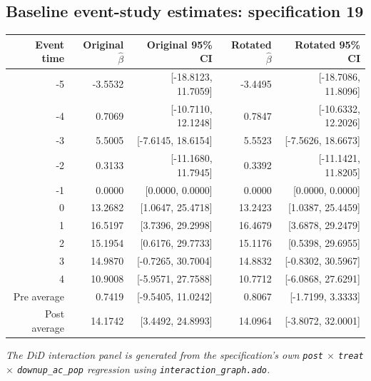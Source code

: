 \documentclass[10pt]{article}
\begin{document}
\subsection*{Baseline event-study estimates: specification 19}
\begin{center}
\scriptsize
\begin{tabular}{r rr rr}
\toprule
Event time & Original $\hat\beta$ & Original 95\% CI & Rotated $\hat\beta$ & Rotated 95\% CI \\
\midrule
-5 & -3.5532 & [-18.8123, 11.7059] & -3.4495 & [-18.7086, 11.8096] \\
-4 & 0.7069 & [-10.7110, 12.1248] & 0.7847 & [-10.6332, 12.2026] \\
-3 & 5.5005 & [-7.6145, 18.6154] & 5.5523 & [-7.5626, 18.6673] \\
-2 & 0.3133 & [-11.1680, 11.7945] & 0.3392 & [-11.1421, 11.8205] \\
-1 & 0.0000 & [0.0000, 0.0000] & 0.0000 & [0.0000, 0.0000] \\
0 & 13.2682 & [1.0647, 25.4718] & 13.2423 & [1.0387, 25.4459] \\
1 & 16.5197 & [3.7396, 29.2998] & 16.4679 & [3.6878, 29.2479] \\
2 & 15.1954 & [0.6176, 29.7733] & 15.1176 & [0.5398, 29.6955] \\
3 & 14.9870 & [-0.7265, 30.7004] & 14.8832 & [-0.8302, 30.5967] \\
4 & 10.9008 & [-5.9571, 27.7588] & 10.7712 & [-6.0868, 27.6291] \\
\midrule
Pre average & 0.7419 & [-9.5405, 11.0242] & 0.8067 & [-1.7199, 3.3333] \\
Post average & 14.1742 & [3.4492, 24.8993] & 14.0964 & [-3.8072, 32.0001] \\
\bottomrule
\end{tabular}
\end{center}
\medskip
\textit{The DiD interaction panel is generated from the specification's own \texttt{post} $\times$ \texttt{treat} $\times$ \texttt{downup\_ac\_pop} regression using \texttt{interaction\_graph.ado}.}
\clearpage
\end{document}
